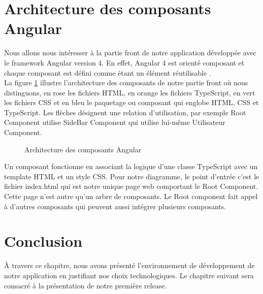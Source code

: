 \section{Architecture des composants Angular}     
\begin{comment}Ce diagramme illustre l'architecture d'une application en termes de composants réutilisables.\\
\end{comment}
Nous allons nous intéresser à la partie front de notre application développée avec le framework Angular version 4.
En effet,  Angular 4 est orienté composant et chaque composant est défini comme étant un élément réutilisable \cite{diagComposant}.\\
La figure \ref{fig:Diagramme de composants} illustre l'architecture des composants de notre partie front où nous
distinguons, en rose les fichiers HTML, en orange les fichiers
TypeScript, en vert les fichiers
CSS et en bleu le paquetage ou composant qui englobe HTML, CSS et TypeScript.
Les flèches désignent une relation d’utilisation, par exemple Root Component utilise SideBar Component
qui utilise lui-même Utilisateur Component.
\newpage
      \begin{figure}[htpb]
\centering
{}
\caption{Architecture des composants Angular}
\label{fig:Diagramme de composants}
\end{figure}

Un composant fonctionne en associant la logique d'une classe TypeScript avec un template HTML et un style CSS.
Pour notre diagramme, le point d'entrée c'est le fichier index.html qui est notre unique page web comportant le Root Component. Cette page n’est
autre qu’un arbre de composants. Le Root component fait appel à d'autres composants qui peuvent aussi intégrer plusieurs composants.
\section*{Conclusion}
  À travers ce chapitre, nous avons présenté l'environnement de développement de notre application en justifiant nos choix technologiques. Le chapitre suivant sera consacré à la présentation de notre première release.
  
